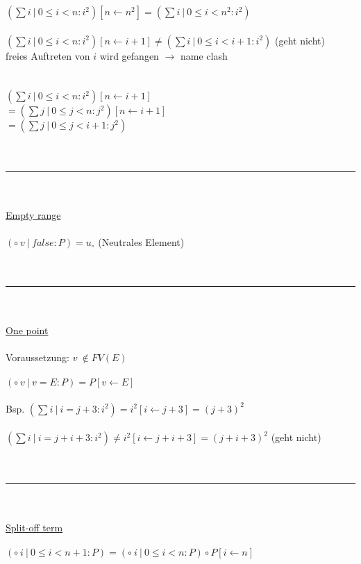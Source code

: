 \documentclass[18pt,a4paper]{article}
\newcommand{\tab}{\hspace*{2em}}
\begin{document}
$(\sum{i} \:\vert\: 0\leqslant i < n : i^2)[n\leftarrow n^2] = (\sum{i} \:\vert\: 0\leqslant i < n^2 : i^2)$\\
\\
$(\sum{i} \:\vert\: 0\leqslant i < n : i^2)[n\leftarrow i+1] \neq (\sum{i} \:\vert\: 0\leqslant i < i+1 : i^2)$ (geht nicht)\\
freies Auftreten von $i$ wird gefangen $\rightarrow$ name clash\\
\\
\\
$(\sum{i} \:\vert\: 0\leqslant i < n : i^2)[n\leftarrow i+1]$\\
$= (\sum{j} \:\vert\: 0\leqslant j < n : j^2)[n\leftarrow i+1]$\\
$= (\sum{j} \:\vert\: 0\leqslant j < i+1 : j^2)$\\
\\
\\
\rule{\textwidth}{0.4mm}\\
\\
\uline{Empty range}\\
\\
$(\circ \:v \:\vert\: false : P ) = u_\circ$ (Neutrales Element)\\
\\
\\
\rule{\textwidth}{0.4mm}\\
\\
\uline{One point}\\
\\
Voraussetzung: $v \:\notin FV(E)$\\
\\
$(\circ \:v \:\vert\: v = E : P ) = P[v\leftarrow E]$\\
\\
Bsp. $(\sum{i} \:\vert\: i = j + 3 : i^2) = i^2[i\leftarrow j+3] = (j+3)^2$\\
\\
\tab $(\sum{i} \:\vert\: i = j + i + 3 : i^2) \neq i^2[i\leftarrow j+i+3] = (j+i+3)^2$ (geht nicht)\\
\\
\\
\rule{\textwidth}{0.4mm}\\
\\
\uline{Split-off term}\\
\\
$(\circ \:i \:\vert\: 0\leqslant i < n+1 : P) = (\circ \:i \:\vert\: 0\leqslant i < n : P) \circ P[i\leftarrow n]$\\
\\
\end{document}
